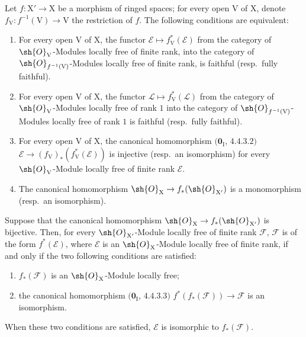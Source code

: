 \begin{lemma}[21.13.2]
\label{IV.21.13.2}
Let $f:\mathrm{X}'\to\mathrm{X}$ be a morphism of ringed spaces; for every open $\mathrm{V}$ of $\mathrm{X}$, denote $f_{\mathrm{V}}:f^{-1}(\mathrm{V})\to\mathrm{V}$ the restriction of $f$.
The following conditions are equivalent:
\begin{enumerate}[label=\emph{\alph*)}]
  \item For every open $\mathrm{V}$ of $\mathrm{X}$, the functor $\mathscr{E}\mapsto f_{\mathrm{V}}^*(\mathscr{E})$ from the category of $\sh{O}_{\mathrm{V}}$-Modules locally free of finite rank, into the category of $\sh{O}_{f^{-1}(\mathrm{V})}$-Modules locally free of finite rank, is faithful (resp.\ fully faithful).
  \item[\emph{a')}] For every open $\mathrm{V}$ of $\mathrm{X}$, the functor $\mathscr{L}\mapsto f_{\mathrm{V}}^*(\mathscr{L})$ from the category of $\sh{O}_{\mathrm{V}}$-Modules locally free of rank $1$ into the category of $\sh{O}_{f^{-1}(\mathrm{V})}$-Modules locally free of rank $1$ is faithful (resp.\ fully faithful).
  \item For every open $\mathrm{V}$ of $\mathrm{X}$, the canonical homomorphism $(\mathbf{0}_{\mathrm{I}}$, $4.4.3.2)$ $\mathscr{E}\to(f_{\mathrm{V}})_*(f_{\mathrm{V}}^*(\mathscr{E}))$ is injective (resp.\ an isomorphism) for every $\sh{O}_{\mathrm{V}}$-Module locally free of finite rank $\mathscr{E}$.
  \item[\emph{b')}] The canonical homomorphism $\sh{O}_{\mathrm{X}}\to f_*(\sh{O}_{\mathrm{X}'})$ is a monomorphism (resp.\ an isomorphism).
\end{enumerate}

Suppose that the canonical homomorphism $\sh{O}_{\mathrm{X}}\to f_*(\sh{O}_{\mathrm{X}'})$ is bijective.
Then, for every $\sh{O}_{\mathrm{X}'}$-Module locally free of finite rank $\mathscr{F}$, $\mathscr{F}$ is of the form $f^*(\mathscr{E})$, where $\mathscr{E}$ is an $\sh{O}_{\mathrm{X}}$-Module locally free of finite rank, if and only if the two following conditions are satisfied:
\begin{enumerate}[label=(\roman*)]
  \item $f_*(\mathscr{F})$ is an $\sh{O}_{\mathrm{X}}$-Module locally free;
  \item the canonical homomorphism $(\mathbf{0}_{\mathrm{I}}$, $4.4.3.3)$ $f^*(f_*(\mathscr{F}))\to\mathscr{F}$ is an isomorphism.
\end{enumerate}
When these two conditions are satisfied, $\mathscr{E}$ is isomorphic to $f_*(\mathscr{F})$.
\end{lemma}

